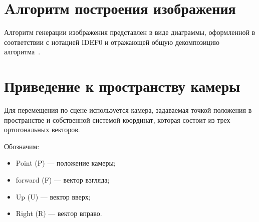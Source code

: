\section{Aлгоритм построения изображения}

Алгоритм генерации изображения представлен в виде диаграммы, оформленной в соответствии с нотацией IDEF0 и отражающей общую декомпозицию алгоритма~\cite{IDEF0}.

\newpage

\newpage

\newpage

\newpage

\section{Приведение к пространству камеры}

Для перемещения по сцене используется камера, задаваемая точкой положения в пространстве и собственной системой координат, которая состоит из трех ортогональных векторов.

Обозначим:
\begin{itemize}
	\item Point (P) --- положение камеры;
	\item forward (F) --- вектор взгляда;
	\item Up (U) --- вектор вверх;
	\item Right (R) --- вектор вправо.
\end{itemize}

